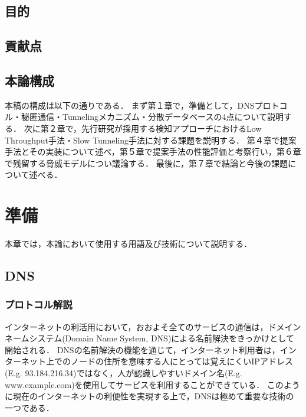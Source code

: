 \documentclass[12pt]{jarticle} %
\begin{document}
\subsection{目的}



\subsection{貢献点}
\subsection{本論構成}
本稿の構成は以下の通りである．
まず第１章で，準備として，DNSプロトコル・秘匿通信・Tunnelingメカニズム・分散データベースの4点について説明する．
次に第２章で，先行研究が採用する検知アプローチにおけるLow Throughput手法・Slow Tunneling手法に対する課題を説明する．
第４章で提案手法とその実装について述べ，第５章で提案手法の性能評価と考察行い，第６章で残留する脅威モデルについ議論する．
最後に，第７章で結論と今後の課題について述べる．

\newpage
\section{準備}
本章では，本論において使用する用語及び技術について説明する．
\subsection{DNS}
\subsubsection{プロトコル解説}
インターネットの利活用において，おおよそ全てのサービスの通信は，ドメインネームシステム(Domain Name System, DNS)による名前解決をきっかけとして開始される．
DNSの名前解決の機能を通じて，インターネット利用者は，インターネット上でのノードの住所を意味する人にとっては覚えにくいIPアドレス(E.g. 93.184.216.34)ではなく，人が認識しやすいドメイン名(E.g. www.example.com)を使用してサービスを利用することができている．
このように現在のインターネットの利便性を実現する上で，DNSは極めて重要な技術の一つである．
\end{document}
